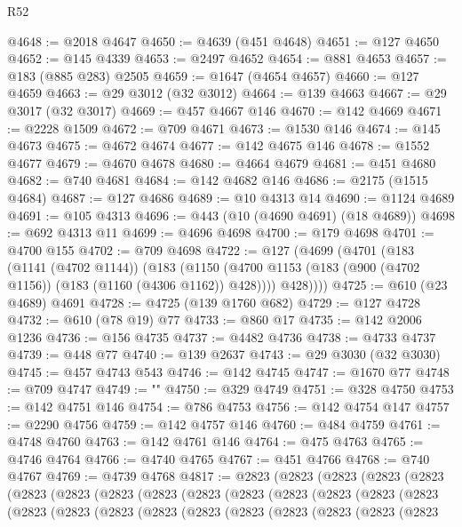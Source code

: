 \begin{lexlean}{R52}
\begin{coremodule}
{{{{{{{{{{{{{{{{{{{{{{{{{{{{{{{{{{{{{{{{{{{{{{{{{{{{{{{{{{{{{{{{{{{{{{{{{{{{{{{{{{{{{{{{{{{{{{{{{{{{{{{{{{{{{{{{{{{{{{{{{{{{{{{{{{{{{{{{{{{{{{{{{{{{{{{{{{{{{{{{{{{{{{{{{{{{{{{{{{{{{{{{{{{{{{{{{{{{{{@4648 := @2018 @4647
@4650 := @4639 (@451 @4648)
@4651 := @127 @4650
@4652 := @145 @4339
@4653 := @2497 @4652
@4654 := @881 @4653
@4657 := @183 (@885 @283) @2505
@4659 := @1647 (@4654 @4657)
@4660 := @127 @4659
@4663 := @29 @3012 (@32 @3012)
@4664 := @139 @4663
@4667 := @29 @3017 (@32 @3017)
@4669 := @457 @4667 @146
@4670 := @142 @4669
@4671 := @2228 @1509
@4672 := @709 @4671
@4673 := @1530 @146
@4674 := @145 @4673
@4675 := @4672 @4674
@4677 := @142 @4675 @146
@4678 := @1552 @4677
@4679 := @4670 @4678
@4680 := @4664 @4679
@4681 := @451 @4680
@4682 := @740 @4681
@4684 := @142 @4682 @146
@4686 := @2175 (@1515 @4684)
@4687 := @127 @4686
@4689 := @10 @4313 @14
@4690 := @1124 @4689
@4691 := @105 @4313
@4696 := @443 (@10 (@4690 @4691) (@18 @4689))
@4698 := @692 @4313 @11
@4699 := @4696 @4698
@4700 := @179 @4698
@4701 := @4700 @155
@4702 := @709 @4698
@4722 := @127
    (@4699
      (@4701
        (@183
          (@1141 (@4702 @1144))
          (@183
            (@1150 (@4700 @1153 (@183 (@900 (@4702 @1156)) (@183 (@1160 (@4306 @1162)) @428))))
            @428))))
@4725 := @610 (@23 @4689) @4691
@4728 := @4725 (@139 @1760 @682)
@4729 := @127 @4728
@4732 := @610 (@78 @19) @77
@4733 := @860 @17
@4735 := @142 @2006 @1236
@4736 := @156 @4735
@4737 := @4482 @4736
@4738 := @4733 @4737
@4739 := @448 @77
@4740 := @139 @2637
@4743 := @29 @3030 (@32 @3030)
@4745 := @457 @4743 @543
@4746 := @142 @4745
@4747 := @1670 @77
@4748 := @709 @4747
@4749 := "\n"
@4750 := @329 @4749
@4751 := @328 @4750
@4753 := @142 @4751 @146
@4754 := @786 @4753
@4756 := @142 @4754 @147
@4757 := @2290 @4756
@4759 := @142 @4757 @146
@4760 := @484 @4759
@4761 := @4748 @4760
@4763 := @142 @4761 @146
@4764 := @475 @4763
@4765 := @4746 @4764
@4766 := @4740 @4765
@4767 := @451 @4766
@4768 := @740 @4767
@4769 := @4739 @4768
@4817 := @2823
    (@2823
      (@2823
        (@2823
          (@2823
            (@2823
              (@2823
                (@2823
                  (@2823
                    (@2823
                      (@2823
                        (@2823
                          (@2823
                            (@2823
                              (@2823
                                (@2823
                                  (@2823
                                    (@2823
                                      (@2823
                                        (@2823
                                          (@2823
                                            (@2823
                                              (@2823
                                                (@2823
                                                  (@2823
}}}}}}}}}}}}}}}}}}}}}}}}}}}}}}}}}}}}}}}}}}}}}}}}}}}}}}}}}}}}}}}}}}}}}}}}}}}}}}}}}}}}}}}}}}}}}}}}}}}}}}}}}}}}}}}}}}}}}}}}}}}}}}}}}}}}}}}}}}}}}}}}}}}}}}}}}}}}}}}}}}}}}}}}}}}}}}}}}}}}}}}}}}}}}}}}}}}}}}
\end{coremodule}
\end{lexlean}
